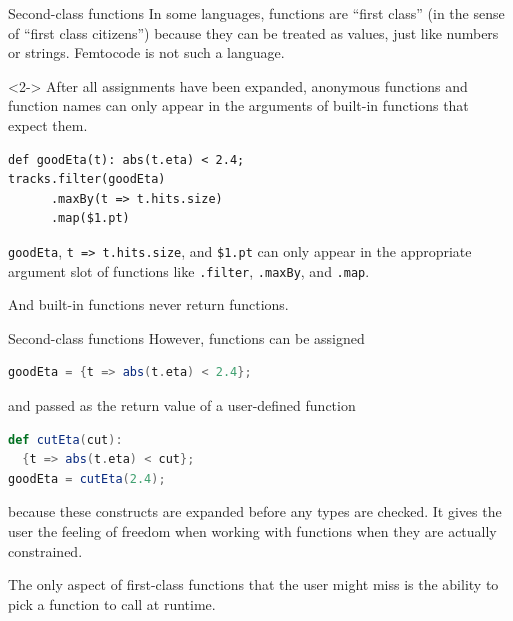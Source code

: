 \documentclass{beamer}
\begin{document}
\begin{frame}[fragile]{Second-class functions}
\vspace{0.5 cm}
In some languages, functions are ``first class'' (in the sense of ``first class citizens'') because they can be treated as values, just like numbers or strings. Femtocode is not such a language.

\vspace{0.5 cm}
\begin{uncoverenv}<2->
After all assignments have been expanded, anonymous functions and function names can only appear in the arguments of built-in functions that expect them.

\begin{center}
\begin{minipage}{0.9\linewidth}
\small
\begin{verbatim}
def goodEta(t): abs(t.eta) < 2.4;
tracks.filter(goodEta)
      .maxBy(t => t.hits.size)
      .map($1.pt)
\end{verbatim}
\end{minipage}
\end{center}

{\tt goodEta}, {\tt t => t.hits.size}, and {\tt \$1.pt} can only appear in the appropriate argument slot of functions like {\tt .filter}, {\tt .maxBy}, and {\tt .map}.

\vspace{0.5 cm}
And built-in functions never return functions.
\end{uncoverenv}
\end{frame}

\begin{frame}[fragile]{Second-class functions}
\vspace{0.5 cm}
However, functions can be assigned
\begin{center}
\begin{minipage}{0.9\linewidth}
\small
\begin{lstlisting}[language=scala]
goodEta = {t => abs(t.eta) < 2.4};
\end{lstlisting}
\end{minipage}
\end{center}
and passed as the return value of a user-defined function
\begin{center}
\begin{minipage}{0.9\linewidth}
\small
\begin{lstlisting}[language=scala]
def cutEta(cut):
  {t => abs(t.eta) < cut};
goodEta = cutEta(2.4);
\end{lstlisting}
\end{minipage}
\end{center}
because these constructs are expanded before any types are checked. It gives the user the feeling of freedom when working with functions when they are actually constrained.

\vspace{0.5 cm}
The only aspect of first-class functions that the user might miss is the ability to pick a function to call at runtime.
\end{frame}
\end{document}
